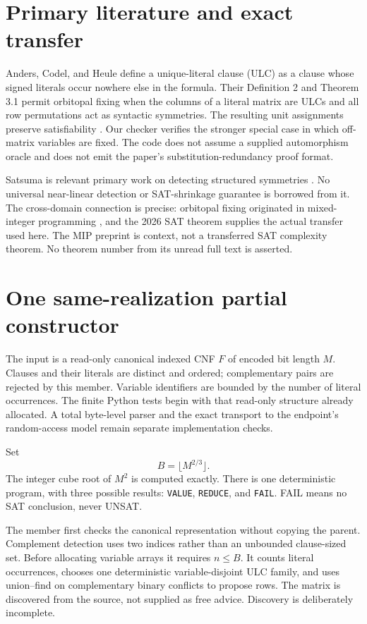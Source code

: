 \documentclass[11pt]{article}
\begin{document}
\section{Primary literature and exact transfer}
Anders, Codel, and Heule define a unique-literal clause (ULC) as a clause whose
signed literals occur nowhere else in the formula. Their Definition 2 and
Theorem 3.1 permit orbitopal fixing when the columns of a literal matrix are
ULCs and all row permutations act as syntactic symmetries. The resulting unit
assignments preserve satisfiability \cite{anderscodelheule2026orbitopal}.
Our checker verifies the stronger special case in which off-matrix variables
are fixed. The code does not assume a supplied automorphism oracle and does
not emit the paper's substitution-redundancy proof format.

Satsuma is relevant primary work on detecting structured symmetries
\cite{andersbrennerrattan2024satsuma}. No universal near-linear detection or
SAT-shrinkage guarantee is borrowed from it. The cross-domain connection is
precise: orbitopal fixing originated in mixed-integer programming
\cite{kaibelpeinhardtpfetsch2006}, and the 2026 SAT theorem supplies the actual
transfer used here. The MIP preprint is context, not a transferred SAT
complexity theorem. No theorem number from its unread full text is asserted.

\section{One same-realization partial constructor}
The input is a read-only canonical indexed CNF $F$ of encoded bit length $M$.
Clauses and their literals are distinct and ordered; complementary pairs are
rejected by this member. Variable identifiers are bounded by the number of
literal occurrences. The finite Python tests begin with that read-only
structure already allocated. A total byte-level parser and the exact transport
to the endpoint's random-access model remain separate implementation checks.

Set
\[
 B=\lfloor M^{2/3}\rfloor.
\]
The integer cube root of $M^2$ is computed exactly. There is one deterministic
program, with three possible results: \texttt{VALUE}, \texttt{REDUCE}, and
\texttt{FAIL}. FAIL means no SAT conclusion, never UNSAT.

The member first checks the canonical representation without copying the
parent. Complement detection uses two indices rather than an unbounded
clause-sized set. Before allocating variable arrays it requires $n\le B$.
It counts literal occurrences, chooses one deterministic variable-disjoint
ULC family, and uses union--find on complementary binary conflicts to propose
rows. The matrix is discovered from the source, not supplied as free advice.
Discovery is deliberately incomplete.
\end{document}
